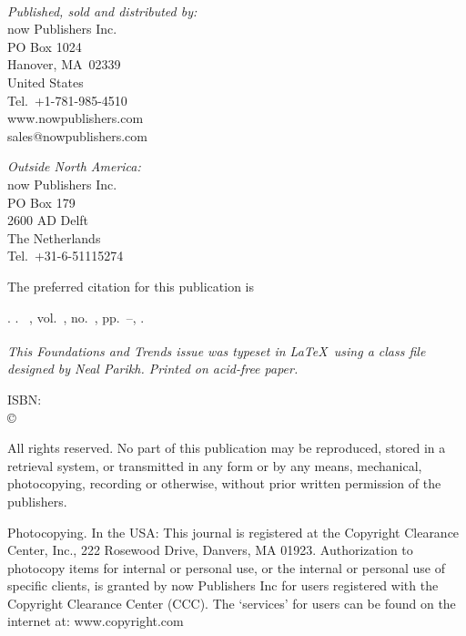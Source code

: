 {\begin{titlepage}
\begin{minipage}{\textwidth}
\bfseries\sffamily\Large \@journaltitleprefix\\ \@journaltitle
\end{minipage}

\parskip6pt
\footnotesize

\vfill

{\itshape Published, sold and distributed by:}\\
now Publishers Inc.\\
PO Box 1024\\
Hanover, MA\ 02339\\
United States\\
Tel.\ +1-781-985-4510\\
www.nowpublishers.com\\
sales@nowpublishers.com

{\itshape Outside North America:}\\
now Publishers Inc.\\
PO Box 179\\
2600 AD Delft\\
The Netherlands\\
Tel.\ +31-6-51115274

The preferred citation for this publication is

{\raggedright
\@copyrightowner. \emph{\@title}.  \@journaltitleprefix\
\@journaltitle, vol.~\@volume, no.~\@issue, pp.~\@firstpage--\@lastpage,
\@pubyear.\par}

{\itshape This Foundations and Trends\textsuperscript{\textregistered} issue
was typeset in \LaTeX\ using a class file designed by Neal Parikh. Printed on
acid-free paper.}

ISBN: \@isbn\\ \copyright\ \@copyrightyear\ \@copyrightowner

\vfill

\fontsize{8}{9}\selectfont
All rights reserved. No part of this publication may be
reproduced, stored in a retrieval system, or transmitted in any form
or by any means, mechanical, photocopying, recording or otherwise,
without prior written permission of the publishers.

Photocopying. In the USA: This journal is registered at the Copyright
Clearance Center, Inc., 222 Rosewood Drive, Danvers, MA 01923. 
Authorization to photocopy items for
internal or personal use, or the internal or personal use of specific
clients, is granted by now Publishers Inc for users registered with 
the Copyright Clearance Center (CCC).
The `services' for users can be found on the internet at:
www.copyright.com


\end{titlepage}}
